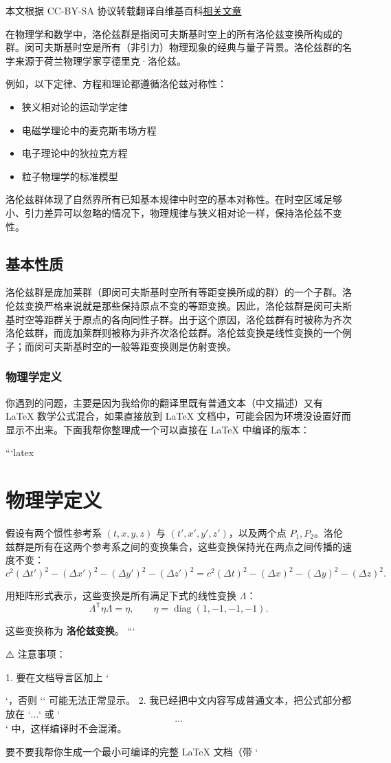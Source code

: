 
本文根据 CC-BY-SA 协议转载翻译自维基百科\href{https://en.wikipedia.org/wiki/Lorentz_group}{相关文章}

在物理学和数学中，洛伦兹群是指闵可夫斯基时空上的所有洛伦兹变换所构成的群。闵可夫斯基时空是所有（非引力）物理现象的经典与量子背景。洛伦兹群的名字来源于荷兰物理学家亨德里克·洛伦兹。

例如，以下定律、方程和理论都遵循洛伦兹对称性：
\begin{itemize}
\item 狭义相对论的运动学定律
\item 电磁学理论中的麦克斯韦场方程
\item 电子理论中的狄拉克方程
\item 粒子物理学的标准模型
\end{itemize}
洛伦兹群体现了自然界所有已知基本规律中时空的基本对称性。在时空区域足够小、引力差异可以忽略的情况下，物理规律与狭义相对论一样，保持洛伦兹不变性。
\subsection{基本性质}
洛伦兹群是庞加莱群（即闵可夫斯基时空所有等距变换所成的群）的一个子群。洛伦兹变换严格来说就是那些保持原点不变的等距变换。因此，洛伦兹群是闵可夫斯基时空等距群关于原点的各向同性子群。出于这个原因，洛伦兹群有时被称为齐次洛伦兹群，而庞加莱群则被称为非齐次洛伦兹群。洛伦兹变换是线性变换的一个例子；而闵可夫斯基时空的一般等距变换则是仿射变换。
\subsubsection{物理学定义}
你遇到的问题，主要是因为我给你的翻译里既有普通文本（中文描述）又有 LaTeX 数学公式混合，如果直接放到 LaTeX 文档中，可能会因为环境没设置好而显示不出来。下面我帮你整理成一个可以直接在 LaTeX 中编译的版本：

```latex
\section*{物理学定义}

假设有两个惯性参考系 $(t, x, y, z)$ 与 $(t', x', y', z')$，以及两个点 $P_1, P_2$。洛伦兹群是所有在这两个参考系之间的变换集合，这些变换保持光在两点之间传播的速度不变：
\[
c^{2}(\Delta t')^{2}-(\Delta x')^{2}-(\Delta y')^{2}-(\Delta z')^{2}
=
c^{2}(\Delta t)^{2}-(\Delta x)^{2}-(\Delta y)^{2}-(\Delta z)^{2}.
\]

用矩阵形式表示，这些变换是所有满足下式的线性变换 $\Lambda$：
\[
\Lambda^{\mathsf{T}} \eta \Lambda = \eta,
\qquad
\eta = \operatorname{diag}(1,-1,-1,-1).
\]

这些变换称为 \textbf{洛伦兹变换}。
```

⚠️ 注意事项：

1. 要在文档导言区加上 `\usepackage{amsmath}`，否则 `` 可能无法正常显示。
2. 我已经把中文内容写成普通文本，把公式部分都放在 `$...$` 或 `\[...\]` 中，这样编译时不会混淆。

要不要我帮你生成一个最小可编译的完整 LaTeX 文档（带 `\documentclass{article}`、`` 等），这样你直接复制就能跑？
